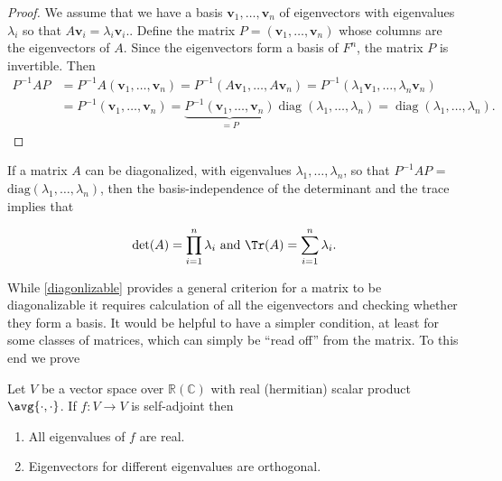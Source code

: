 \documentclass[a4paper,12pt]{report}
\begin{document}
\begin{proof}
We assume that we have a basis \( \mathbf{v}_1, \dots, \mathbf{v}_n \) of eigenvectors with eigenvalues \( \lambda_i \) so that \(A \mathbf{v}_i = \lambda_i \mathbf{v}_i.\). Define the matrix \(P = (\mathbf{v}_1, \dots, \mathbf{v}_n)\)  whose columns are the eigenvectors of \( A \). Since the eigenvectors form a basis of \( F^n \), the matrix \( P \) is invertible. Then
\begin{equation}
\begin{aligned}
P^{-1} A P &= P^{-1} A (\mathbf{v}_1, \dots, \mathbf{v}_n) 
           = P^{-1} (A \mathbf{v}_1, \dots, A \mathbf{v}_n) 
           = P^{-1} (\lambda_1 \mathbf{v}_1, \dots, \lambda_n \mathbf{v}_n) \\
           &= P^{-1} (\mathbf{v}_1, \dots, \mathbf{v}_n) 
           = \underbrace{P^{-1} (\mathbf{v}_1, \dots, \mathbf{v}_n)}_{=P} 
           \operatorname{diag}(\lambda_1, \dots, \lambda_n) 
           = \operatorname{diag}(\lambda_1, \dots, \lambda_n).
\end{aligned}
\end{equation}
\end{proof}

If a matrix \(A\) can be diagonalized, with eigenvalues \(\lambda _{1}, \ldots , \lambda _{n}   \), so that \(P^{-1} AP\) = \(\text{diag}(\lambda _{1}, \ldots , \lambda _{n}  ) \), then the basis-independence of the determinant and the trace implies that

\begin{equation}
    \det (A) = \prod_{i=1}^{n} \lambda _{i} \text { and } \Tr (A) = \sum_{i=1}^{n} \lambda _{i}.  
\end{equation}

While \cref{diagonlizable} provides a general criterion for a matrix to be diagonalizable it requires calculation of all the eigenvectors and checking whether they form a basis. It would be helpful to have a simpler condition, at least for some classes of matrices, which can simply be ``read off'' from the matrix. To this end we prove

\begin{theorem}
Let \(V\) be a vector space over \(\mathbb{R} (\mathbb{C})\) with real (hermitian) scalar product \(\avg{\cdot ,\cdot } \). If \(f: V \rightarrow V\) is self-adjoint then
\begin{enumerate}[label=(P\arabic*)]
    \item All eigenvalues of \(f\) are real.
    \item Eigenvectors for different eigenvalues are orthogonal.
\end{enumerate}
   
\end{theorem}
\end{document}
